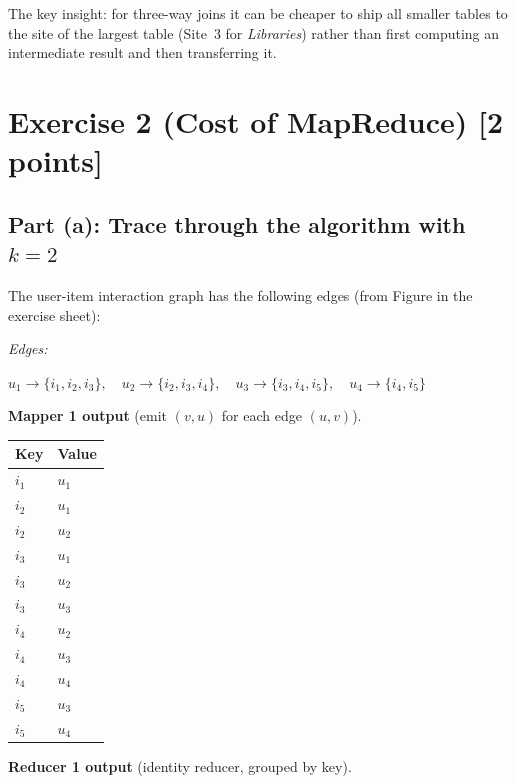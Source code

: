 \documentclass[a4paper,11pt]{article}
\newcommand{\Libraries}{\textit{Libraries}}
\begin{document}
The key insight: for three-way joins it can be cheaper to ship all smaller tables to the site of the largest table (Site~3 for \Libraries) rather than first computing an intermediate result and then transferring it.

\newpage
\section*{Exercise 2 (Cost of MapReduce) [2 points]}

\subsection*{Part (a): Trace through the algorithm with $k = 2$}

The user-item interaction graph has the following edges (from Figure in the exercise sheet):

\medskip
\textit{Edges:}
\begin{center}
$u_1\!\to\!\{i_1,i_2,i_3\},\quad
 u_2\!\to\!\{i_2,i_3,i_4\},\quad
 u_3\!\to\!\{i_3,i_4,i_5\},\quad
 u_4\!\to\!\{i_4,i_5\}$
\end{center}

\medskip

\textbf{Mapper 1 output} (emit $(v, u)$ for each edge $(u, v)$).

\begin{center}
\begin{tabular}{ll}
\toprule
\textbf{Key} & \textbf{Value} \\
\midrule
$i_1$ & $u_1$ \\
$i_2$ & $u_1$ \\
$i_2$ & $u_2$ \\
$i_3$ & $u_1$ \\
$i_3$ & $u_2$ \\
$i_3$ & $u_3$ \\
$i_4$ & $u_2$ \\
$i_4$ & $u_3$ \\
$i_4$ & $u_4$ \\
$i_5$ & $u_3$ \\
$i_5$ & $u_4$ \\
\bottomrule
\end{tabular}
\end{center}

\medskip

\textbf{Reducer 1 output} (identity reducer, grouped by key).
\end{document}
